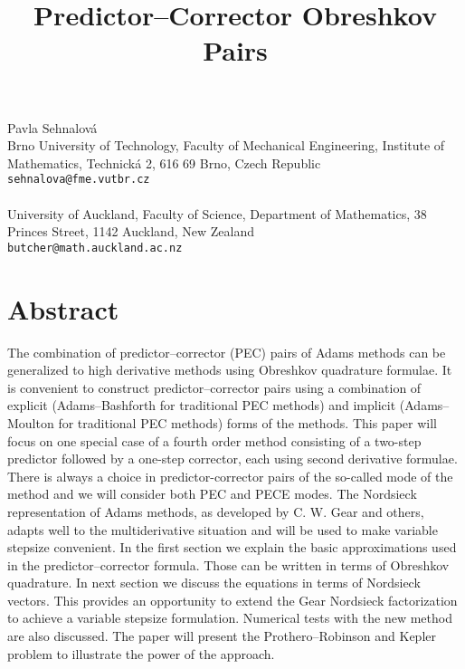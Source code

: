 \title{Predictor--Corrector Obreshkov Pairs}
 \author{} \institute{}
\maketitle
\begin{center}
{\large Pavla Sehnalov\'{a}}\\
Brno University of Technology, Faculty of Mechanical Engineering, Institute of Mathematics, Technick\'{a} 2, 616 69 Brno, Czech Republic\\
{\tt sehnalova@fme.vutbr.cz}
\\ \vspace{4mm}{\large John Butcher}\\
University of Auckland, Faculty of Science, Department of Mathematics, 38 Princes Street, 1142 Auckland, New Zealand\\
{\tt butcher@math.auckland.ac.nz}

\end{center}

\section*{Abstract}

The combination of predictor--corrector (PEC) pairs of Adams methods can be generalized to high derivative methods using Obreshkov quadrature formulae. It is convenient to construct predictor--corrector pairs using a combination of explicit (Adams--Bashforth for traditional PEC methods) and implicit (Adams--Moulton for traditional PEC methods) forms of the methods. This paper will focus on one special case of a fourth order method consisting of a two-step predictor followed by a one-step corrector, each using second derivative formulae. There is always a choice in predictor-corrector pairs of the so-called mode of the method and we will consider both PEC and PECE modes. The Nordsieck representation of Adams methods, as developed by C. W. Gear and others, adapts well to the multiderivative situation and will be used to make variable stepsize convenient. In the first section we explain the basic approximations used in the predictor--corrector formula. Those can be written in terms of Obreshkov quadrature. In next section we discuss the equations in terms of Nordsieck vectors. This provides an opportunity to extend the Gear Nordsieck factorization to achieve a variable stepsize formulation. Numerical tests with the new method are also discussed. The paper will present the Prothero--Robinson and Kepler problem to illustrate the power of the approach. 

